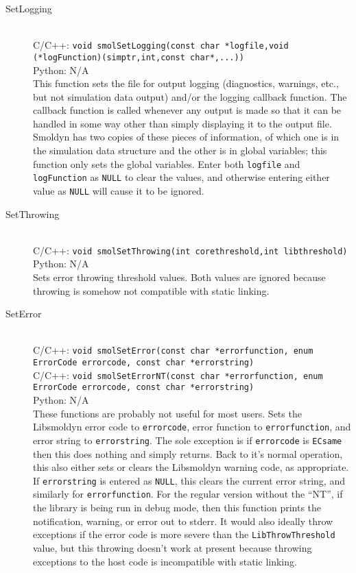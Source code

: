 \documentclass {scrbook}
\newcommand {\ttt} {\texttt}
\begin{document}
\begin{description}

\item[SetLogging]
\hfill \\
C/C++: \ttt{void smolSetLogging(const char *logfile,void (*logFunction)(simptr,int,const char*,...))}\\
Python: N/A\\
This function sets the file for output logging (diagnostics, warnings, etc., but not simulation data output) and/or the logging callback function. The callback function is called whenever any output is made so that it can be handled in some way other than simply displaying it to the output file. Smoldyn has two copies of these pieces of information, of which one is in the simulation data structure and the other is in global variables; this function only sets the global variables. Enter both \ttt{logfile} and \ttt{logFunction} as \ttt{NULL} to clear the values, and otherwise entering either value as \ttt{NULL} will cause it to be ignored.

\item[SetThrowing]
\hfill \\
C/C++: \ttt{void smolSetThrowing(int corethreshold,int libthreshold)}
Python: N/A\\
Sets error throwing threshold values. Both values are ignored because throwing is somehow not compatible with static linking.

\item[SetError]
\hfill \\
C/C++: \ttt{void smolSetError(const char *errorfunction, enum ErrorCode errorcode, const char *errorstring)}\\
C/C++: \ttt{void smolSetErrorNT(const char *errorfunction, enum ErrorCode errorcode, const char *errorstring)}\\
Python: N/A\\
These functions are probably not useful for most users. Sets the Libsmoldyn error code to \ttt{errorcode}, error function to \ttt{errorfunction}, and error string to \ttt{errorstring}. The sole exception is if \ttt{errorcode} is \ttt{ECsame} then this does nothing and simply returns. Back to it's normal operation, this also either sets or clears the Libsmoldyn warning code, as appropriate. If \ttt{errorstring} is entered as \ttt{NULL}, this clears the current error string, and similarly for \ttt{errorfunction}. For the regular version without the ``NT'', if the library is being run in debug mode, then this function prints the notification, warning, or error out to stderr. It would also ideally throw exceptions if the error code is more severe than the \ttt{LibThrowThreshold} value, but this throwing doesn't work at present because throwing exceptions to the host code is incompatible with static linking.


\end{description}
\end{document}
